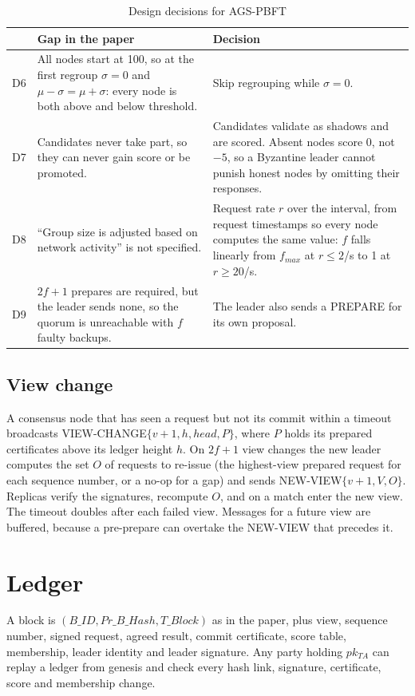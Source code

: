 \begin{table}[h]
\centering
\caption{Design decisions for AGS-PBFT}
\label{tab:dd}
\begin{tabular}{@{}p{0.6cm}p{6.2cm}p{6.8cm}@{}}
\toprule
& Gap in the paper & Decision \\
\midrule
D6 & All nodes start at 100, so at the first regroup $\sigma = 0$ and $\mu - \sigma = \mu + \sigma$: every node is both above and below threshold. & Skip regrouping while $\sigma = 0$. \\
D7 & Candidates never take part, so they can never gain score or be promoted. & Candidates validate as shadows and are scored. Absent nodes score 0, not $-5$, so a Byzantine leader cannot punish honest nodes by omitting their responses. \\
D8 & ``Group size is adjusted based on network activity'' is not specified. & Request rate $r$ over the interval, from request timestamps so every node computes the same value: $f$ falls linearly from $f_{max}$ at $r \le 2$/s to 1 at $r \ge 20$/s. \\
D9 & $2f+1$ prepares are required, but the leader sends none, so the quorum is unreachable with $f$ faulty backups. & The leader also sends a PREPARE for its own proposal. \\
\bottomrule
\end{tabular}
\end{table}

\subsection{View change}

A consensus node that has seen a request but not its commit within a timeout
broadcasts VIEW-CHANGE$\{v+1, h, head, P\}$, where $P$ holds its prepared
certificates above its ledger height $h$. On $2f+1$ view changes the new
leader computes the set $O$ of requests to re-issue (the highest-view prepared
request for each sequence number, or a no-op for a gap) and sends
NEW-VIEW$\{v+1, V, O\}$. Replicas verify the signatures, recompute $O$, and on
a match enter the new view. The timeout doubles after each failed view.
Messages for a future view are buffered, because a pre-prepare can overtake
the NEW-VIEW that precedes it.

\section{Ledger}

A block is $(B\_ID, Pr\_B\_Hash, T\_Block)$ as in the paper, plus view,
sequence number, signed request, agreed result, commit certificate, score
table, membership, leader identity and leader signature. Any party holding
$pk_{TA}$ can replay a ledger from genesis and check every hash link,
signature, certificate, score and membership change.
